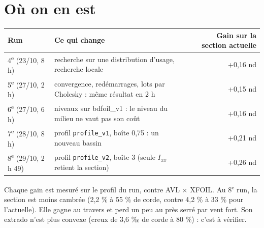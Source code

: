 \documentclass[11pt,a4paper]{article}
\newcommand{\py}[1]{\texttt{#1}}
\begin{document}
\section{Où on en est}
{\small
\begin{tabularx}{\linewidth}{@{}l>{\raggedright\arraybackslash}X r@{}}
\toprule
Run & Ce qui change & Gain sur la section actuelle \\
\midrule
4\textsuperscript{e} (23/10, 8 h) & recherche sur une distribution d'usage, recherche locale & +0,16 nd \\
5\textsuperscript{e} (27/10, 2 h) & convergence, redémarrages, lots par Cholesky : même résultat en 2 h & +0,15 nd \\
6\textsuperscript{e} (27/10, 6 h) & 3 niveaux sur bdfoil\_v1 : le niveau du milieu ne vaut pas son coût & +0,16 nd \\
7\textsuperscript{e} (28/10, 8 h) & profil \py{profile\_v1}, boîte 0,75 : un nouveau bassin & +0,21 nd \\
8\textsuperscript{e} (29/10, 2 h 49) & profil \py{profile\_v2}, boîte 3 (seule $I_{xx}$ retient la section) & +0,26 nd \\
\bottomrule
\end{tabularx}}

Chaque gain est mesuré sur le profil du run, contre AVL × XFOIL. Au 8\textsuperscript{e} run, la section est
moins cambrée (2,2 \% à 55 \% de corde, contre 4,2 \% à 33 \% pour l'actuelle). Elle gagne au travers et perd
un peu au près serré par vent fort. Son extrado n'est plus convexe (creux de 3,6 ‰ de corde à 80 \%) : c'est
à vérifier.

\end{document}
